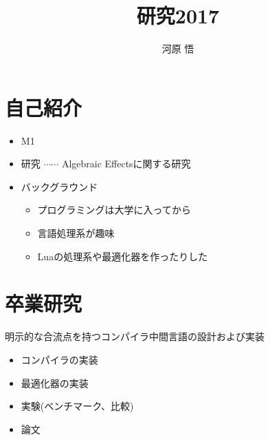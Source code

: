 \documentclass[unicode,compress,14pt,CJK%
\directlua{
    handout = os.getenv"HANDOUT"
    local _ = handout and tex.print(",handout")
},t]{beamer}
\title{研究2017}
\author{河原 悟}
\institute{研究室紹介 2018}
\begin{document}
\maketitle

\section{自己紹介}
\begin{frame}
    \frametitlesec

    \begin{itemize}
        \item M1
        \item 研究 $\cdots\cdots$ Algebraic Effectsに関する研究
        \item バックグラウンド

            \begin{itemize}
                \item プログラミングは大学に入ってから
                \item 言語処理系が趣味
                \item Luaの処理系や最適化器を作ったりした
            \end{itemize}
    \end{itemize}
\end{frame}

\section{卒業研究}
\begin{frame}
    \frametitlesec

    明示的な合流点を持つコンパイラ中間言語の設計および実装

    \begin{itemize}
        \item コンパイラの実装
        \item 最適化器の実装
        \item 実験(ベンチマーク、比較)
        \item 論文
    \end{itemize}
\end{frame}
\end{document}
